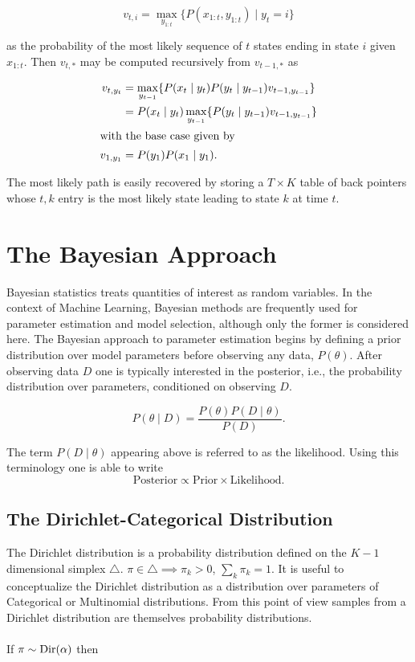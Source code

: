 \documentclass[12pt]{report}
\newcommand{\1}[0]{\mathbbm{1}}
\newcommand{\Dir}[0]{\textnormal{Dir}}
\newcommand{\seq}[3]{\ensuremath{#1_{{#2}:{#3}}}}
\begin{document}
\[
    v_{t,i} = \max_{\seq{y}{1}{t}}\{P(\seq{x}{1}{t}, \seq{y}{1}{t}) \mid y_t = i\}
\]

as the probability of the most likely sequence of $t$ states ending in state $i$
given $\seq{x}{1}{t}$. Then $v_{t,*}$ may be computed recursively from $v_{t-1,*}$ as

\begin{align*}
    v_{t,y_t}
    &= \max_{y_{t-1}}\{ P(x_{t} \mid y_t) P(y_t \mid y_{t-1}) v_{t-1,y_{t-1}} \} \\
    &= P(x_t \mid y_t) \max_{y_{t-1}}\{ P(y_t \mid y_{t-1}) v_{t-1,y_{t-1}} \} \\
\intertext{with the base case given by}
    v_{1,y_1} &= P(y_1)P(x_1 \mid y_1).
\end{align*}

The most likely path is easily recovered by storing a $T \times K$ table of back pointers
whose $t,k$ entry is the most likely state leading to state $k$ at time $t$.

\section{The Bayesian Approach}
Bayesian statistics treats quantities of interest as random variables.
In the context of Machine Learning, Bayesian methods are frequently used
for parameter estimation and model selection, although only the former is
considered here. The Bayesian approach to parameter estimation begins by
defining a prior distribution over model parameters before observing any data,
$P(\theta)$. After observing data $D$ one is typically interested in the
posterior, i.e., the probability distribution over parameters, conditioned on observing
$D$.

\[
    P(\theta \mid D) = \frac{P(\theta)P(D \mid \theta)}{P(D)}.
\]

The term $P(D \mid \theta)$ appearing above is referred to as the likelihood.
Using this terminology one is able to write
\[
    \text{Posterior} \propto \text{Prior} \times \text{Likelihood}.
\]

\subsection{The Dirichlet-Categorical Distribution}
The Dirichlet distribution is a probability distribution defined on the $K-1$
dimensional simplex $\triangle$. $\pi \in \triangle \implies \pi_k > 0$, $\sum_k \pi_k = 1$.
It is useful to conceptualize the Dirichlet distribution as a distribution over
parameters of Categorical or Multinomial distributions. From this point of view
samples from a Dirichlet distribution are themselves probability distributions.
\\\\
If $\pi \sim \Dir(\alpha)$ then
\end{document}
